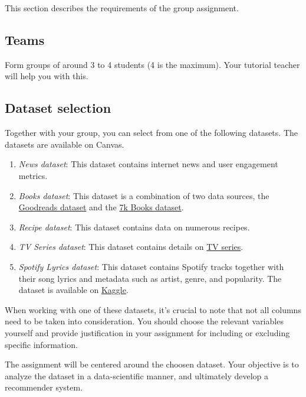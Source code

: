 This section describes the requirements of the group assignment. 

\subsection*{Teams}

Form groups of around 3 to 4 students (4 is the maximum). Your tutorial teacher will help you with this.

\subsection*{Dataset selection}
Together with your group, you can select from one of the following datasets. The datasets are available on Canvas. 

\begin{enumerate}
	\item \emph{News dataset}: This dataset contains internet news and user engagement metrics. 
 	\item \emph{Books dataset}: This dataset is a combination of two data sources, the \href{https://www.kaggle.com/datasets/jealousleopard/goodreadsbooks?resource=download}{Goodreads dataset} and the \href{https://www.kaggle.com/datasets/dylanjcastillo/7k-books-with-metadata}{7k Books dataset}.
	\item \emph{Recipe dataset}: This dataset contains data on numerous recipes. 
	\item \emph{TV Series dataset}: This dataset contains details on \href{https://www.kaggle.com/datasets/bourdier/all-tv-series-details-dataset}{TV series}.
	\item \emph{Spotify Lyrics dataset}: This dataset contains Spotify tracks together with their song lyrics and metadata such as artist, genre, and popularity. The dataset is available on \href{https://www.kaggle.com/datasets/evabot/spotify-lyrics-dataset}{Kaggle}.
\end{enumerate}



When working with one of these datasets, it's crucial to note that not all columns need to be taken into consideration. You should choose the relevant variables yourself and provide justification in your assignment for including or excluding specific information.

The assignment will be centered around the choosen dataset. Your objective is to analyze the dataset in a data-scientific manner, and ultimately develop a recommender system.

